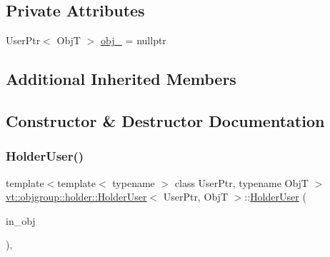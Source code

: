 \subsection*{Private Attributes}
\begin{DoxyCompactItemize}
\item 
User\+Ptr$<$ ObjT $>$ \hyperlink{structvt_1_1objgroup_1_1holder_1_1_holder_user_a7e5ba27e81a9cb9aa4bfe4eb3ee04e5c}{obj\+\_\+} = nullptr
\end{DoxyCompactItemize}
\subsection*{Additional Inherited Members}


\subsection{Constructor \& Destructor Documentation}
\mbox{\label{structvt_1_1objgroup_1_1holder_1_1_holder_user_a5c81ffca6d44450a02c9d74c650d2178}} 
\subsubsection{\texorpdfstring{Holder\+User()}{HolderUser()}}
{\footnotesize\ttfamily template$<$template$<$ typename $>$ class User\+Ptr, typename ObjT $>$ \\
\hyperlink{structvt_1_1objgroup_1_1holder_1_1_holder_user}{vt\+::objgroup\+::holder\+::\+Holder\+User}$<$ User\+Ptr, ObjT $>$\+::\hyperlink{structvt_1_1objgroup_1_1holder_1_1_holder_user}{Holder\+User} (\begin{DoxyParamCaption}\item[{User\+Ptr$<$ ObjT $>$}]{in\+\_\+obj }\end{DoxyParamCaption})\hspace{0.3cm}{\ttfamily [inline]}, {\ttfamily [explicit]}}

\mbox{\label{structvt_1_1objgroup_1_1holder_1_1_holder_user_a694de38808a7075ef8fa919d9e983c8b}} 
